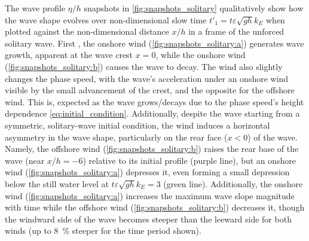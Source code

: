 \documentclass{jfm}
\renewcommand*{\epsilon}{\varepsilon}
\begin{document}
The wave profile $\eta/h$ snapshots in \cref{fig:snapshots_solitary}
qualitatively show how the wave shape evolves over non-dimensional slow
time $t'_1 = t \epsilon \sqrt{g h} k_E$ when plotted against the
non-dimensional distance $x/h$ in a frame of the unforced solitary wave.
First , the onshore wind (\cref{fig:snapshots_solitary:a}) generates
wave growth, apparent at the wave crest $x=0$, while the onshore wind
(\cref{fig:snapshots_solitary:b}) causes the wave to decay.
The wind also slightly changes the phase speed, with the wave's
acceleration under an onshore wind visible by the small advancement of
the crest, and the opposite for the offshore wind.
This is, expected as the wave grows/decays due to the phase speed's
height dependence \cref{eq:initial_condition}.
Additionally, despite the wave starting from a symmetric, solitary-wave
initial condition, the wind induces a horizontal asymmetry in the wave
shape, particularly on the rear face ($x<0$) of the wave.
Namely, the offshore wind (\cref{fig:snapshots_solitary:b}) raises the
rear base of the wave (near $x/h = -6$) relative to its initial profile
(purple line), but an onshore wind (\cref{fig:snapshots_solitary:a})
depresses it, even forming a small depression below the still water
level at $t\epsilon \sqrt{gh} k_E=3$ (green line).
Additionally, the onshore wind (\cref{fig:snapshots_solitary:a})
increases the maximum wave slope magnitude with time while the offshore
wind (\cref{fig:snapshots_solitary:b}) decreases it, though the windward
side of the wave becomes steeper than the leeward side for both winds
(up to \SI{8}{\percent} steeper for the time period shown).
\end{document}
